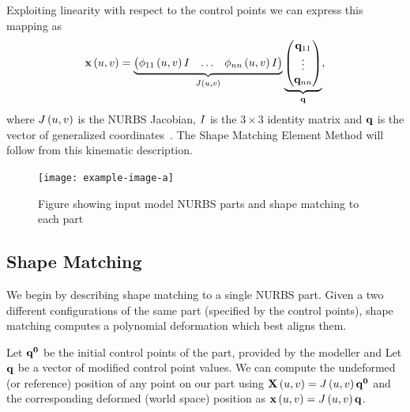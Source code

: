 Exploiting linearity with respect to the control points  we can express this mapping as 
\begin{equation}
    \mathbf{x}\left(u,v\right) = \underbrace{\begin{pmatrix} \phi_{11}\left(u,v\right)I & \dots & \phi_{nn}\left(u,v\right)I \end{pmatrix}}_{J\left(u,v\right)}
    \underbrace{\begin{pmatrix} \mathbf{q}_{11} \\ \vdots \\ \mathbf{q}_{nn}\end{pmatrix}}_{\mathbf{q}},
\end{equation} where $J\left(u,v\right)$ is the NURBS Jacobian, $I$ is the $3\times3$ identity matrix and $\mathbf{q}$ is the vector of generalized coordinates~.
The Shape Matching Element Method will follow from this kinematic description.

\begin{figure}
    \texttt{[image: example-image-a]}
    \caption{Figure showing input model NURBS parts and shape matching to each part}
    \label{fig:shapematching}
\end{figure}

\subsection{Shape Matching}
\label{sec:shapematching}

We begin by describing shape matching to a single NURBS part. 
Given a two different configurations of the same part (specified by the control points), shape matching computes a polynomial deformation which best aligns them.

Let $\mathbf{q^0}$ be the initial control points of the part, provided by the modeller and Let $\mathbf{q}$ be a vector of modified control point values.
We can compute the undeformed (or reference) position of any point on our part using $\mathbf{X}\left(u,v\right) = J\left(u,v\right)\mathbf{q^0}$ and the corresponding
deformed (world space) position as $\mathbf{x}\left(u,v\right) = J\left(u,v\right)\mathbf{q}$.

